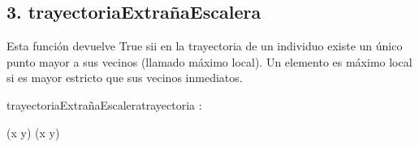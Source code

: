 \documentclass[10pt,a4paper]{article}
\begin{document}
	\subsection*{3. trayectoriaExtrañaEscalera}
	Esta función devuelve True sii en la trayectoria de un individuo existe un único punto mayor a sus vecinos (llamado máximo local). Un elemento es máximo local si es mayor estricto que sus vecinos inmediatos.



	\begin{proc}{trayectoriaExtrañaEscalera}{\In trayectoria : \TLista{\float}}{\bool}
		
		\hfill





		{(x \wedge \neg y) \lor (\neg x \wedge y)}

		
	\end{proc}
\end{document}
